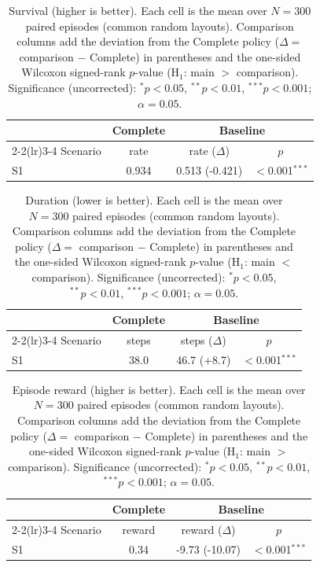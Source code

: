 \begin{table}[ht]
  \centering
  \caption{Survival (higher is better). Each cell is the mean over $N=300$ paired episodes (common random layouts). Comparison columns add the deviation from the Complete policy ($\Delta=$ comparison $-$ Complete) in parentheses and the one-sided Wilcoxon signed-rank $p$-value (H$_1$: main $>$ comparison). Significance (uncorrected): $^{*}p<0.05$, $^{**}p<0.01$, $^{***}p<0.001$; $\alpha=0.05$.}
  \label{tab:wilcoxon-survival}
  \small
  \begin{tabular}{l c cc}
    \toprule
     & Complete & \multicolumn{2}{c}{Baseline} \\
    \cmidrule(lr){2-2}\cmidrule(lr){3-4}
    Scenario & {rate} & {rate ($\Delta$)} & {$p$} \\
    \midrule
    S1 & 0.934 & 0.513 (-0.421) & $<$0.001$^{***}$ \\
    \bottomrule
  \end{tabular}
\end{table}

\begin{table}[ht]
  \centering
  \caption{Duration (lower is better). Each cell is the mean over $N=300$ paired episodes (common random layouts). Comparison columns add the deviation from the Complete policy ($\Delta=$ comparison $-$ Complete) in parentheses and the one-sided Wilcoxon signed-rank $p$-value (H$_1$: main $<$ comparison). Significance (uncorrected): $^{*}p<0.05$, $^{**}p<0.01$, $^{***}p<0.001$; $\alpha=0.05$.}
  \label{tab:wilcoxon-duration}
  \small
  \begin{tabular}{l c cc}
    \toprule
     & Complete & \multicolumn{2}{c}{Baseline} \\
    \cmidrule(lr){2-2}\cmidrule(lr){3-4}
    Scenario & {steps} & {steps ($\Delta$)} & {$p$} \\
    \midrule
    S1 & 38.0 & 46.7 (+8.7) & $<$0.001$^{***}$ \\
    \bottomrule
  \end{tabular}
\end{table}

\begin{table}[ht]
  \centering
  \caption{Episode reward (higher is better). Each cell is the mean over $N=300$ paired episodes (common random layouts). Comparison columns add the deviation from the Complete policy ($\Delta=$ comparison $-$ Complete) in parentheses and the one-sided Wilcoxon signed-rank $p$-value (H$_1$: main $>$ comparison). Significance (uncorrected): $^{*}p<0.05$, $^{**}p<0.01$, $^{***}p<0.001$; $\alpha=0.05$.}
  \label{tab:wilcoxon-reward}
  \small
  \begin{tabular}{l c cc}
    \toprule
     & Complete & \multicolumn{2}{c}{Baseline} \\
    \cmidrule(lr){2-2}\cmidrule(lr){3-4}
    Scenario & {reward} & {reward ($\Delta$)} & {$p$} \\
    \midrule
    S1 & 0.34 & -9.73 (-10.07) & $<$0.001$^{***}$ \\
    \bottomrule
  \end{tabular}
\end{table}
